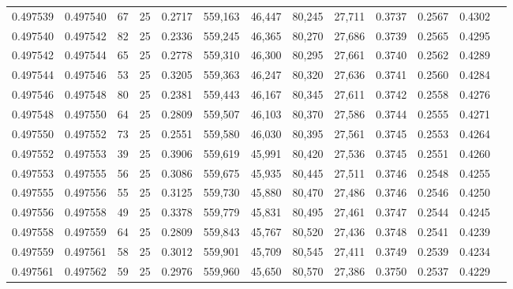 \begin{tabular}{rrrrrrrrrrrrr}
0.497539 & 0.497540 &    67 &  25 &                                     0.2717 & 559,163 &  46,447 &  80,245 &  27,711 & 0.3737 & 0.2567 & 0.4302 \\
0.497540 & 0.497542 &    82 &  25 &                                     0.2336 & 559,245 &  46,365 &  80,270 &  27,686 & 0.3739 & 0.2565 & 0.4295 \\
0.497542 & 0.497544 &    65 &  25 &                                     0.2778 & 559,310 &  46,300 &  80,295 &  27,661 & 0.3740 & 0.2562 & 0.4289 \\
0.497544 & 0.497546 &    53 &  25 &                                     0.3205 & 559,363 &  46,247 &  80,320 &  27,636 & 0.3741 & 0.2560 & 0.4284 \\
0.497546 & 0.497548 &    80 &  25 &                                     0.2381 & 559,443 &  46,167 &  80,345 &  27,611 & 0.3742 & 0.2558 & 0.4276 \\
0.497548 & 0.497550 &    64 &  25 &                                     0.2809 & 559,507 &  46,103 &  80,370 &  27,586 & 0.3744 & 0.2555 & 0.4271 \\
0.497550 & 0.497552 &    73 &  25 &                                     0.2551 & 559,580 &  46,030 &  80,395 &  27,561 & 0.3745 & 0.2553 & 0.4264 \\
0.497552 & 0.497553 &    39 &  25 &                                     0.3906 & 559,619 &  45,991 &  80,420 &  27,536 & 0.3745 & 0.2551 & 0.4260 \\
0.497553 & 0.497555 &    56 &  25 &                                     0.3086 & 559,675 &  45,935 &  80,445 &  27,511 & 0.3746 & 0.2548 & 0.4255 \\
0.497555 & 0.497556 &    55 &  25 &                                     0.3125 & 559,730 &  45,880 &  80,470 &  27,486 & 0.3746 & 0.2546 & 0.4250 \\
0.497556 & 0.497558 &    49 &  25 &                                     0.3378 & 559,779 &  45,831 &  80,495 &  27,461 & 0.3747 & 0.2544 & 0.4245 \\
0.497558 & 0.497559 &    64 &  25 &                                     0.2809 & 559,843 &  45,767 &  80,520 &  27,436 & 0.3748 & 0.2541 & 0.4239 \\
0.497559 & 0.497561 &    58 &  25 &                                     0.3012 & 559,901 &  45,709 &  80,545 &  27,411 & 0.3749 & 0.2539 & 0.4234 \\
0.497561 & 0.497562 &    59 &  25 &                                     0.2976 & 559,960 &  45,650 &  80,570 &  27,386 & 0.3750 & 0.2537 & 0.4229 \\

\end{tabular}
